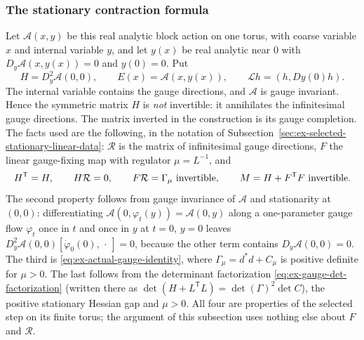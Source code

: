 \subsubsection{The stationary contraction formula}
Let $\mathcal A(x,y)$ be this real analytic block action on one torus,
with coarse variable $x$ and internal variable $y$, and let $y(x)$ be
real analytic near $0$ with
$D_y\mathcal A(x,y(x))=0$ and $y(0)=0$. Put
\[
 H=D_y^2\mathcal A(0,0),\qquad
 E(x)=\mathcal A(x,y(x)),\qquad \mathcal Lh=(h,Dy(0)h).
\]
The internal variable contains the gauge directions, and $\mathcal A$
is gauge invariant. Hence the symmetric matrix $H$ is \emph{not}
invertible: it annihilates the infinitesimal gauge directions. The
matrix inverted in the construction is its gauge completion. The facts
used are the following, in the notation of
Subsection~\ref{sec:ex-selected-stationary-linear-data}: $\mathcal R$ is
the matrix of infinitesimal gauge directions, $F$ the linear
gauge-fixing map with regulator $\mu=L^{-1}$, and
\begin{equation}\label{eq:ex-stationary-completion}
 H^{\mathsf T}=H,\qquad H\mathcal R=0,\qquad
 F\mathcal R=\Gamma_\mu\ \hbox{invertible},\qquad
 M=H+F^{\mathsf T}F\ \hbox{invertible}.
\end{equation}
The second property follows from gauge invariance of $\mathcal A$ and
stationarity at $(0,0)$: differentiating
$\mathcal A(0,\varphi_t(y))=\mathcal A(0,y)$ along a one-parameter gauge
flow $\varphi_t$ once in $t$ and once in $y$ at $t=0$, $y=0$ leaves
$D_y^2\mathcal A(0,0)[\dot\varphi_0(0),\,\cdot\,]=0$, because the other
term contains $D_y\mathcal A(0,0)=0$. The third is
\eqref{eq:ex-actual-gauge-identity}, where $\Gamma_\mu=d^*d+C_\mu$ is
positive definite for $\mu>0$. The last follows from the determinant
factorization \eqref{eq:ex-gauge-det-factorization} (written there as
$\det(H+L^{\mathsf T}L)=\det(\Gamma)^2\det C$), the positive stationary
Hessian gap and $\mu>0$. All four are properties of the selected step
on its finite torus; the argument of this subsection uses nothing else
about $F$ and $\mathcal R$.

